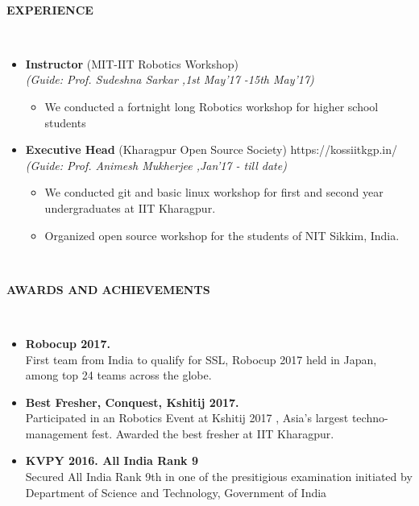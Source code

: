 \documentclass[a4paper,10pt]{article}
\newcommand{\isep}{-2 pt}
\newcommand{\lsep}{-0.5cm}
\newcommand{\resheading}[1]{{\small \colorbox{mygrey}{\begin{minipage}{0.975\textwidth}{\textbf{#1 \vphantom{p\^{E}}}}\end{minipage}}}}
\begin{document}
\hspace{0.5cm}\\[-0.2cm]
\resheading{\textbf{ EXPERIENCE } }\\[\lsep]
\begin{itemize}
\item \textbf{Instructor} (MIT-IIT Robotics Workshop) \\
 \emph{(Guide: Prof. Sudeshna Sarkar
,1st May'17 -15th May'17)} \\[-0.6cm]
	\begin{itemize}\itemsep \isep
	\item We conducted a fortnight long Robotics workshop for higher school students
	\end{itemize} 

\item \textbf{Executive Head} (Kharagpur Open Source Society) \hspace{0.5cm} {https://kossiitkgp.in/}\\
 \emph{(Guide: Prof. Animesh Mukherjee
,Jan'17 - till date)} \\[-0.6cm]
	\begin{itemize}\itemsep \isep
	\item We conducted git and basic linux workshop for first and second year undergraduates at IIT Kharagpur.
	\item Organized open source workshop for the students of NIT Sikkim, India.
	\end{itemize} 

\end{itemize}

\hspace{0.5cm}\\[-0.2cm]
\resheading{\textbf{AWARDS AND ACHIEVEMENTS} }\\[\lsep]
\begin{itemize}
\item \noindent \textbf{Robocup 2017.} \\
First team from India to qualify for SSL, Robocup 2017 held in Japan, among top 24 teams across the globe.

\item \noindent \textbf{Best Fresher, Conquest, Kshitij 2017.} \\
Participated in an Robotics Event at
Kshitij 2017
, Asia’s largest techno-management fest.  Awarded the
best fresher at IIT Kharagpur.

\item \noindent \textbf{KVPY 2016. All India Rank 9} \\
Secured All India Rank 9th in one of the presitigious examination initiated by Department of Science and Technology, Government of India
\end{itemize}
\end{document}
